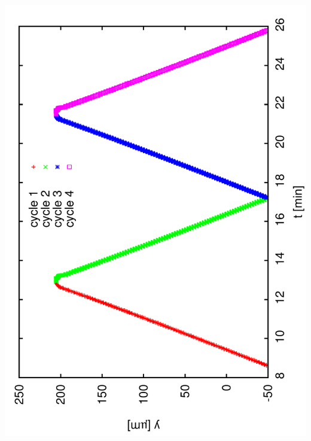 \documentclass[a4paper,11pt]{book}
\begin{document}
\includegraphics[angle=-90,scale=0.15]{image21.pdf}
\end{document}
